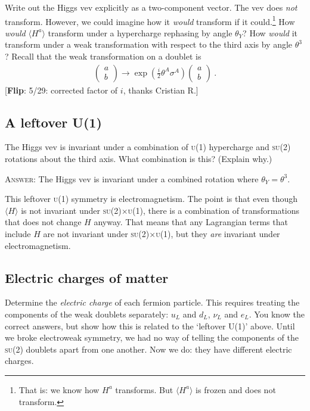 \documentclass[12pt]{article}
\newcommand{\acro}[1]{\textsc{\MakeLowercase{#1}}}
\numberwithin{equation}{section}    %
\newcommand{\flip}[1]{{\color{red} [\textbf{Flip}: {#1}]}}
\begin{document}
Write out the Higgs vev explicitly as a two-component vector. The vev does \emph{not} transform. However, we could imagine how it \emph{would} transform if it could.\footnote{That is: we know how $H^a$ transforms. But $\langle H^a\rangle$ is frozen and does not transform.} How \emph{would} $\langle H^a\rangle$ transform under a hypercharge rephasing by angle $\theta_Y$? How \emph{would} it transform under a weak transformation with respect to the third axis by angle $\theta^3$? Recall that the weak transformation on a doublet is
\begin{align}
	\begin{pmatrix}
	a\\
	b
	\end{pmatrix}
	\to 
	\exp\left(\frac{i}{2}\theta^A \sigma^A\right)
	\begin{pmatrix}
	a\\
	b
	\end{pmatrix} \ .
\end{align}
\flip{5/29: corrected factor of $i$, thanks Cristian R.}

\subsection{A leftover U(1)}

The Higgs vev is invariant under a combination of \acro{U(1)} hypercharge and \acro{SU(2)} rotations about the third axis. What combination is this? (Explain why.)

\textsc{Answer}: The Higgs vev is invariant under a combined rotation where $\theta_Y = \theta^3$.

This leftover \acro{U(1)} symmetry is electromagnetism. The point is that even though $\langle H \rangle$ is not invariant under \acro{SU(2)}$\times$\acro{U(1)}, there is a combination of transformations that does not change $H$ anyway. That means that any Lagrangian terms that include $H$ are not invariant under \acro{SU(2)}$\times$\acro{U(1)}, but they \emph{are} invariant under electromagnetism.

\subsection{Electric charges of matter}

Determine the \emph{electric charge} of each fermion particle. This requires treating the components of the weak doublets separately: $u_L$ and $d_L$, $\nu_L$ and $e_L$. You know the correct answers, but show how this is related to the `leftover U(1)' above. Until we broke electroweak symmetry, we had no way of telling the components of the \acro{SU(2)} doublets apart from one another. Now we do: they have different electric charges.
\end{document}
